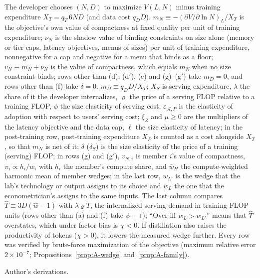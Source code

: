 \begin{table}[tp]
\begin{tablenotes}The developer chooses $(N,D)$ to maximize $V(L,N)$ minus training expenditure $X_T=q_T\,6ND$ (and data cost $q_DD$). $m_N\equiv-(\partial V/\partial\ln N)_L/X_T$ is the objective's own value of compactness at fixed quality per unit of training expenditure; $\nu_N$ is the shadow value of binding constraints on size alone (memory or tier caps, latency objectives, menus of sizes) per unit of training expenditure, nonnegative for a cap and negative for a menu that binds as a floor; $v_N\equiv m_N+\nu_N$ is the value of compactness, which equals $m_N$ when no size constraint binds; rows other than (d), (d$'$), (e) and (g)--(g$'$) take $m_D=0$, and rows other than (f) take $\delta=0$. $m_D\equiv q_DD/X_T$; $X_S$ is serving expenditure, $\lambda$ the share of it the developer internalizes, $\varrho$ the price of a serving FLOP relative to a training FLOP, $\phi$ the size elasticity of serving cost; $\varepsilon_{\mathcal A,P}$ is the elasticity of adoption with respect to users' serving cost; $\xi_Z$ and $\mu\ge0$ are the multipliers of the latency objective and the data cap, $\ell$ the size elasticity of latency; in the post-training row, post-training expenditure $X_P$ is counted as a cost alongside $X_T$, so that $m_N$ is net of it; $\delta$ ($\delta_S$) is the size elasticity of the price of a training (serving) FLOP; in rows (g) and (g$'$), $v_{N,i}$ is member $i$'s value of compactness, $\pi_i\propto h_i/w_i$ with $h_i$ the member's compute share, and $\bar w_H$ the compute-weighted harmonic mean of member wedges; in the last row, $w_{L'}$ is the wedge that the lab's technology or output assigns to its choice and $w_L$ the one that the econometrician's assigns to the same inputs. The last column compares $\hat T\equiv3D(\hat w-1)$ with $\lambda\varrho T$, the internalized serving demand in training-FLOP units (rows other than (a) and (f) take $\phi=1$); ``Over iff $w_L>w_{L'}$'' means that $\hat T$ overstates, which under factor bias is $\chi<0$. If distillation also raises the productivity of tokens ($\chi>0$), it lowers the measured wedge further. Every row was verified by brute-force maximization of the objective (maximum relative error $2\times10^{-7}$; Propositions~\ref{prop:A-wedge} and~\ref{prop:A-family}).\end{tablenotes}
\begin{tablenotes}[Source]Author's derivations.\end{tablenotes}
\end{table}
